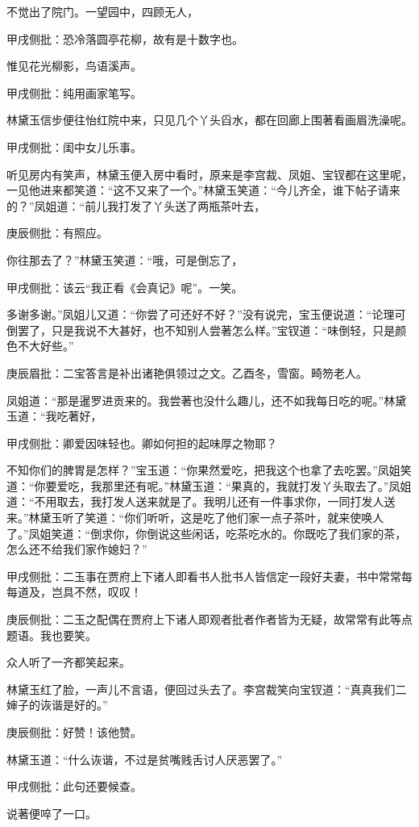 \begin{parag}
    不觉出了院门。一望园中，四顾无人，\begin{note}甲戌侧批：恐冷落圆亭花柳，故有是十数字也。\end{note}惟见花光柳影，鸟语溪声。\begin{note}甲戌侧批：纯用画家笔写。\end{note}林黛玉信步便往怡红院中来，只见几个丫头舀水，都在回廊上围著看画眉洗澡呢。\begin{note}甲戌侧批：闺中女儿乐事。\end{note}听见房内有笑声，林黛玉便入房中看时，原来是李宫裁、凤姐、宝钗都在这里呢，一见他进来都笑道：“这不又来了一个。”林黛玉笑道：“今儿齐全，谁下帖子请来的？”凤姐道：“前儿我打发了丫头送了两瓶茶叶去，\begin{note}庚辰侧批：有照应。\end{note}你往那去了？”林黛玉笑道：“哦，可是倒忘了，\begin{note}甲戌侧批：该云“我正看《会真记》呢”。一笑。\end{note}多谢多谢。”凤姐儿又道：“你尝了可还好不好？”没有说完，宝玉便说道：“论理可倒罢了，只是我说不大甚好，也不知别人尝著怎么样。”宝钗道：“味倒轻，只是颜色不大好些。”\begin{note}庚辰眉批：二宝答言是补出诸艳俱领过之文。乙酉冬，雪窗。畸笏老人。\end{note}凤姐道：“那是暹罗进贡来的。我尝著也没什么趣儿，还不如我每日吃的呢。”林黛玉道：“我吃著好，\begin{note}甲戌侧批：卿爱因味轻也。卿如何担的起味厚之物耶？\end{note}不知你们的脾胃是怎样？”宝玉道：“你果然爱吃，把我这个也拿了去吃罢。”凤姐笑道：“你要爱吃，我那里还有呢。”林黛玉道：“果真的，我就打发丫头取去了。”凤姐道：“不用取去，我打发人送来就是了。我明儿还有一件事求你，一同打发人送来。”林黛玉听了笑道：“你们听听，这是吃了他们家一点子茶叶，就来使唤人了。”凤姐笑道：“倒求你，你倒说这些闲话，吃茶吃水的。你既吃了我们家的茶，怎么还不给我们家作媳妇？”\begin{note}甲戌侧批：二玉事在贾府上下诸人即看书人批书人皆信定一段好夫妻，书中常常每每道及，岂具不然，叹叹！\end{note}\begin{note}庚辰侧批：二玉之配偶在贾府上下诸人即观者批者作者皆为无疑，故常常有此等点题语。我也要笑。\end{note}众人听了一齐都笑起来。
\end{parag}


\begin{parag}
    林黛玉红了脸，一声儿不言语，便回过头去了。李宫裁笑向宝钗道：“真真我们二婶子的诙谐是好的。”\begin{note}庚辰侧批：好赞！该他赞。\end{note}林黛玉道：“什么诙谐，不过是贫嘴贱舌讨人厌恶罢了。”\begin{note}甲戌侧批：此句还要候查。\end{note}说著便啐了一口。
\end{parag}


